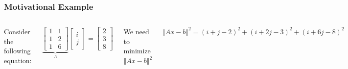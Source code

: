 \documentclass[aspectratio=169]{beamer}
\newcommand{\incfig}[2][1]{%
    \def\svgwidth{#1\columnwidth}
    {#2.pdf_tex} }
\begin{document}
\begin{frame} %
	\frametitle{Motivational Example}  %
	\begin{columns}


	Consider the following equation:

	\begin{equation*}
		\underbrace{\begin{bmatrix} 1 & 1 \\ 1 & 2 \\ 1 & 6 \end{bmatrix}}_A \begin{bmatrix} i \\ j  \end{bmatrix} = \begin{bmatrix} 2 \\ 3 \\ 8 \end{bmatrix}
	\end{equation*}

	We need to minimize $ \Vert Ax - b  \Vert^2$

	\[ \Vert Ax - b  \Vert^2 = (i + j -2)^2 + (i + 2j -3)^2 + (i + 6j -8)^2 \] 
		

	\begin{figure}[ht]
    		\centering
	    \incfig{satelite}
	\end{figure}
	\end{columns}

\end{frame}
\end{document}
